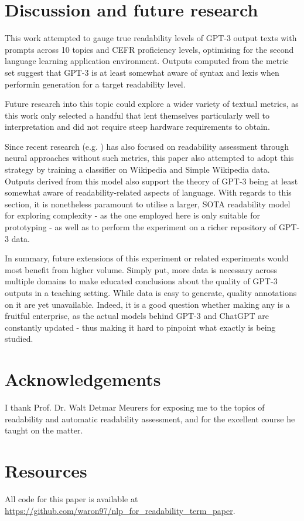 \documentclass[11pt]{article}
\begin{document}
\section{Discussion and future research}

This work attempted to gauge true readability levels of GPT-3 output texts with prompts across 10 topics and CEFR proficiency levels, optimising for the second language learning application environment. Outputs computed from the metric set suggest that GPT-3 is at least somewhat aware of syntax and lexis when performin generation for a target readability level.

Future research into this topic could explore a wider variety of textual metrics, as this work only selected a handful that lent themselves particularly well to interpretation and did not require steep hardware requirements to obtain. 

Since recent research (e.g. \citealp{Deutsch_2020}) has also focused on readability assessment through neural approaches without such metrics, this paper also attempted to adopt this strategy by training a classifier on Wikipedia and Simple Wikipedia data. Outputs derived from this model also support the theory of GPT-3 being at least somewhat aware of readability-related aspects of language. With regards to this section, it is nonetheless paramount to utilise a larger, SOTA readability model for exploring complexity - as the one employed here is only suitable for prototyping - as well as to perform the experiment on a richer repository of GPT-3 data.

In summary, future extensions of this experiment or related experiments would most benefit from higher volume. Simply put, more data is necessary across multiple domains to make educated conclusions about the quality of GPT-3 outputs in a teaching setting. While data is easy to generate, quality annotations on it are yet unavailable. Indeed, it is a good question whether making any is a fruitful enterprise, as the actual models behind GPT-3 and ChatGPT are constantly updated - thus making it hard to pinpoint what exactly is being studied.


\section*{Acknowledgements}

I thank Prof. Dr. Walt Detmar Meurers for exposing me to the topics of readability and automatic readability assessment, and for the excellent course he taught on the matter.



\appendix
\section*{Resources}

\label{sec:appendix}

All code for this paper is available at \url{https://github.com/waron97/nlp_for_readability_term_paper}.
\end{document}
